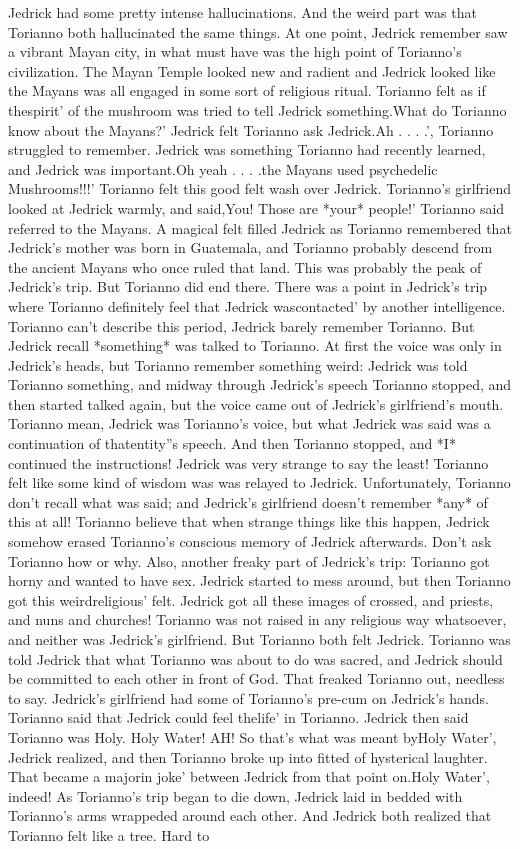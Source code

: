 \documentclass[12pt]{book}
\begin{document}
Jedrick had some pretty intense hallucinations. And the weird part was that Torianno both hallucinated the same things. At one point, Jedrick remember saw a vibrant Mayan city, in what must have was the high point of Torianno's civilization. The Mayan Temple looked new and radient and Jedrick looked like the Mayans was all engaged in some sort of religious ritual. Torianno felt as if thespirit' of the mushroom was tried to tell Jedrick something.What do Torianno know about the Mayans?' Jedrick felt Torianno ask Jedrick.Ah . . .  .', Torianno struggled to remember. Jedrick was something Torianno had recently learned, and Jedrick was important.Oh yeah . . .  .the Mayans used psychedelic Mushrooms!!!' Torianno felt this good felt wash over Jedrick. Torianno's girlfriend looked at Jedrick warmly, and said,You! Those are *your* people!' Torianno said referred to the Mayans. A magical felt filled Jedrick as Torianno remembered that Jedrick's mother was born in Guatemala, and Torianno probably descend from the ancient Mayans who once ruled that land. This was probably the peak of Jedrick's trip. But Torianno did end there. There was a point in Jedrick's trip where Torianno definitely feel that Jedrick wascontacted' by another intelligence. Torianno can't describe this period, Jedrick barely remember Torianno. But Jedrick recall *something* was talked to Torianno. At first the voice was only in Jedrick's heads, but Torianno remember something weird: Jedrick was told Torianno something, and midway through Jedrick's speech Torianno stopped, and then started talked again, but the voice came out of Jedrick's girlfriend's mouth. Torianno mean, Jedrick was Torianno's voice, but what Jedrick was said was a continuation of thatentity''s speech. And then Torianno stopped, and *I* continued the instructions! Jedrick was very strange to say the least! Torianno felt like some kind of wisdom was was relayed to Jedrick. Unfortunately, Torianno don't recall what was said; and Jedrick's girlfriend doesn't remember *any* of this at all! Torianno believe that when strange things like this happen, Jedrick somehow erased Torianno's conscious memory of Jedrick afterwards. Don't ask Torianno how or why. Also, another freaky part of Jedrick's trip: Torianno got horny and wanted to have sex. Jedrick started to mess around, but then Torianno got this weirdreligious' felt. Jedrick got all these images of crossed, and priests, and nuns and churches! Torianno was not raised in any religious way whatsoever, and neither was Jedrick's girlfriend. But Torianno both felt Jedrick. Torianno was told Jedrick that what Torianno was about to do was sacred, and Jedrick should be committed to each other in front of God. That freaked Torianno out, needless to say. Jedrick's girlfriend had some of Torianno's pre-cum on Jedrick's hands. Torianno said that Jedrick could feel thelife' in Torianno. Jedrick then said Torianno was Holy. Holy Water! AH! So that's what was meant byHoly Water', Jedrick realized, and then Torianno broke up into fitted of hysterical laughter. That became a majorin joke' between Jedrick from that point on.Holy Water', indeed! As Torianno's trip began to die down, Jedrick laid in bedded with Torianno's arms wrappeded around each other. And Jedrick both realized that Torianno felt like a tree. Hard to 
\end{document}
